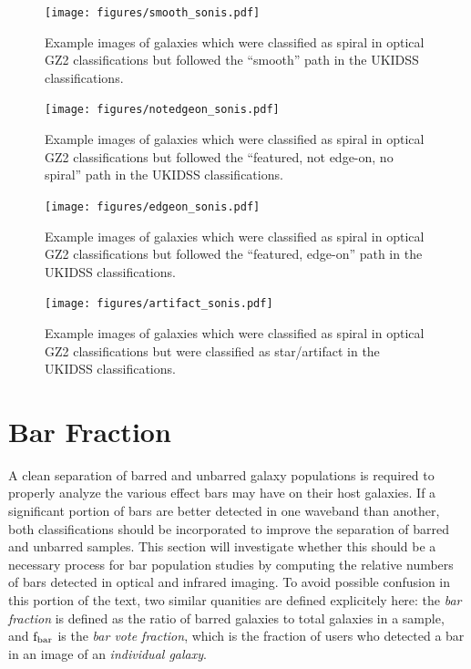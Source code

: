 \begin{figure}
\centering
\texttt{[image: figures/smooth\_sonis.pdf]}
\caption{Example images of galaxies which were classified as spiral in optical GZ2 classifications but followed the ``smooth'' path in the UKIDSS classifications.}
\label{fig:smooth}
\end{figure}

\begin{figure}
\centering
\texttt{[image: figures/notedgeon\_sonis.pdf]}
\caption{Example images of galaxies which were classified as spiral in optical GZ2 classifications but followed the ``featured, not edge-on, no spiral'' path in the UKIDSS classifications.}
\label{fig:notedgeon}
\end{figure}

 
\begin{figure}
\centering
\texttt{[image: figures/edgeon\_sonis.pdf]}
\caption{Example images of galaxies which were classified as spiral in optical GZ2 classifications but followed the ``featured, edge-on'' path in the UKIDSS classifications.}
\label{fig:edgeon}
\end{figure}

 
\begin{figure}
\centering
\texttt{[image: figures/artifact\_sonis.pdf]}
\caption{Example images of galaxies which were classified as spiral in optical GZ2 classifications but were classified as star/artifact in the UKIDSS classifications.}
\label{fig:artifact}
\end{figure}


\section{Bar Fraction}
A clean separation of barred and unbarred galaxy populations is required to properly analyze the various effect bars may have on their host galaxies. If a significant portion of bars are better detected in one waveband than another, both classifications should be incorporated to improve the separation of barred and unbarred samples. This section will investigate whether this should be a necessary process for bar population studies by computing the relative numbers of bars detected in optical and infrared imaging. To avoid possible confusion in this portion of the text, two similar quanities are defined explicitely here: the \emph{bar fraction} is defined as the ratio of barred galaxies to total galaxies in a sample, and $\rm f_{bar}$ is the \emph{bar vote fraction}, which is the fraction of users who detected a bar in an image of an \emph{individual galaxy}.

